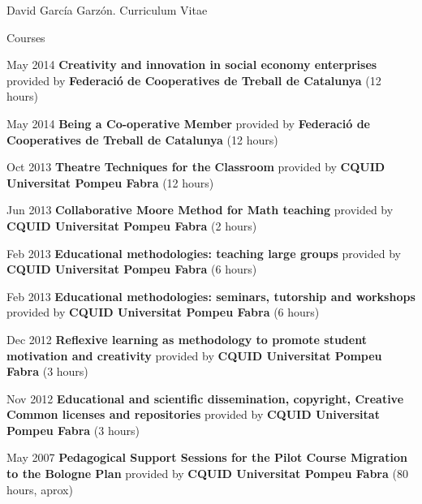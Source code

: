 \documentclass{article}
\begin{document}
\begin{cv}{David García Garzón. Curriculum Vitae}
\begin{cvlist}{Courses}
\item[May 2014]
	{\bf Creativity and innovation in social economy enterprises } provided by {\bf Federació de Cooperatives de Treball de Catalunya} (12 hours)

\item[May 2014]
	{\bf Being a Co-operative Member } provided by {\bf Federació de Cooperatives de Treball de Catalunya} (12 hours)

\item[Oct 2013]
	{\bf Theatre Techniques for the Classroom } provided by {\bf CQUID Universitat Pompeu Fabra} (12 hours)

\item[Jun 2013]
	{\bf Collaborative Moore Method for Math teaching } provided by {\bf CQUID Universitat Pompeu Fabra} (2 hours)

\item[Feb 2013]
	{\bf Educational methodologies: teaching large groups } provided by {\bf CQUID Universitat Pompeu Fabra} (6 hours)

\item[Feb 2013]
	{\bf Educational methodologies: seminars, tutorship and workshops } provided by {\bf CQUID Universitat Pompeu Fabra} (6 hours)

\item[Dec 2012]
	{\bf Reflexive learning as methodology to promote student motivation and creativity } provided by {\bf CQUID Universitat Pompeu Fabra} (3 hours)

\item[Nov 2012]
	{\bf Educational and scientific dissemination, copyright, Creative Common licenses and repositories } provided by {\bf CQUID Universitat Pompeu Fabra} (3 hours)

\item[May 2007]
	{\bf Pedagogical Support Sessions for the Pilot Course Migration to the Bologne Plan } provided by {\bf CQUID Universitat Pompeu Fabra} (80 hours, aprox)

\end{cvlist}


\end{cv}
\end{document}
